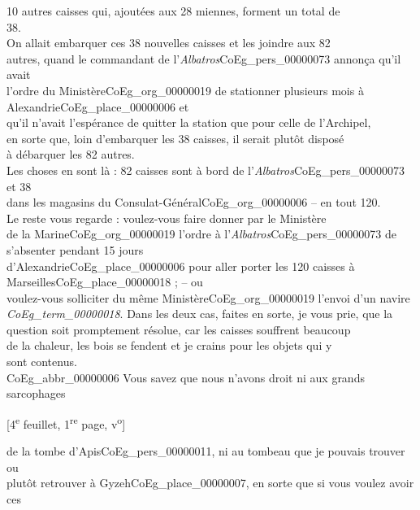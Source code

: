\documentclass{book}
\begin{document}
10 autres caisses qui, ajoutées aux 28 miennes, forment un total de\\
38.\\
\indent On allait embarquer ces 38 nouvelles caisses et les joindre aux 82\\
autres, quand le commandant de l’\textit{Albatros}\gls{CoEg_pers_00000073} annonça qu’il avait\\
l’ordre du Ministère\gls{CoEg_org_00000019} de stationner plusieurs mois à Alexandrie\gls{CoEg_place_00000006} et\\
qu’il n’avait l’espérance de quitter la station que pour celle de l’Archipel,\\
en sorte que, loin d’embarquer les 38 caisses, il serait plutôt disposé\\
à débarquer les 82 autres.\\
\indent Les choses en sont là : 82 caisses sont à bord de l’\textit{Albatros}\gls{CoEg_pers_00000073} et 38\\
dans les magasins du Consulat-Général\gls{CoEg_org_00000006} – en tout 120.\\
\indent Le reste vous regarde : voulez-vous faire donner par le Ministère\\
de la Marine\gls{CoEg_org_00000019} l’ordre à l’\textit{Albatros}\gls{CoEg_pers_00000073} de s’absenter pendant 15 jours\\
d’Alexandrie\gls{CoEg_place_00000006} pour aller porter les 120 caisses à Marseilles\gls{CoEg_place_00000018} ; – ou\\
voulez-vous solliciter du même Ministère\gls{CoEg_org_00000019} l’envoi d’un navire\\
\textit{\gls{CoEg_term_00000018}}. Dans les deux cas, faites en sorte, je vous prie, que la\\
question soit promptement résolue, car les caisses souffrent beaucoup\\
de la chaleur, les bois se fendent et je crains pour les objets qui y\\
sont contenus.\\
\indent \gls{CoEg_abbr_00000006} Vous savez que nous n’avons droit ni aux grands sarcophages
{\footnotesize\begin{center} {[4\textsuperscript{e} feuillet, 1\textsuperscript{re} page, v\textsuperscript{o}]}\end{center}}
\noindent de la tombe d’Apis\gls{CoEg_pers_00000011}, ni au tombeau que je pouvais trouver ou\\
plutôt retrouver à Gyzeh\gls{CoEg_place_00000007}, en sorte que si vous voulez avoir ces\\
\end{document}

